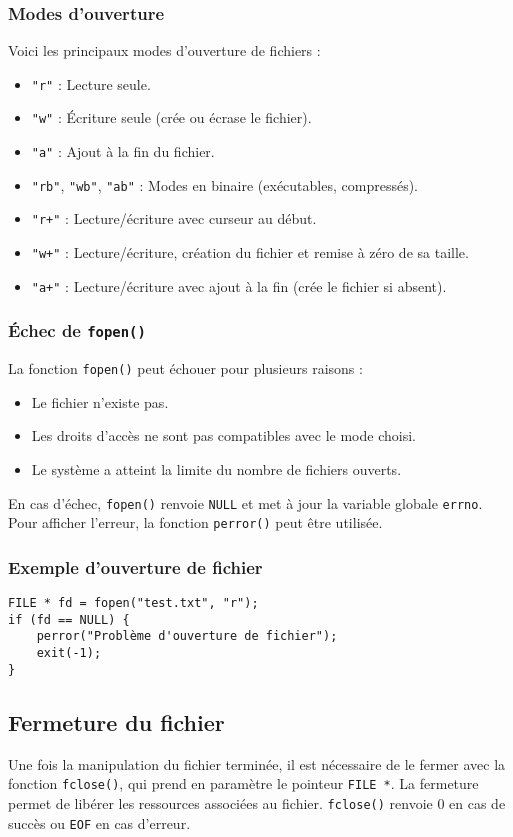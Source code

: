 \documentclass[french,11pt]{article}
\begin{document}
\subsubsection{Modes d’ouverture}
Voici les principaux modes d’ouverture de fichiers :
\begin{itemize}
    \item \texttt{"r"} : Lecture seule.
    \item \texttt{"w"} : Écriture seule (crée ou écrase le fichier).
    \item \texttt{"a"} : Ajout à la fin du fichier.
    \item \texttt{"rb"}, \texttt{"wb"}, \texttt{"ab"} : Modes en binaire (exécutables, compressés).
    \item \texttt{"r+"} : Lecture/écriture avec curseur au début.
    \item \texttt{"w+"} : Lecture/écriture, création du fichier et remise à zéro de sa taille.
    \item \texttt{"a+"} : Lecture/écriture avec ajout à la fin (crée le fichier si absent).
\end{itemize}

\subsubsection{Échec de \texttt{fopen()}}
La fonction \texttt{fopen()} peut échouer pour plusieurs raisons :
\begin{itemize}
    \item Le fichier n’existe pas.
    \item Les droits d’accès ne sont pas compatibles avec le mode choisi.
    \item Le système a atteint la limite du nombre de fichiers ouverts.
\end{itemize}
En cas d’échec, \texttt{fopen()} renvoie \texttt{NULL} et met à jour la variable globale \texttt{errno}. Pour afficher l’erreur, la fonction \texttt{perror()} peut être utilisée.

\subsubsection{Exemple d'ouverture de fichier}
\begin{verbatim}
FILE * fd = fopen("test.txt", "r");
if (fd == NULL) {
    perror("Problème d'ouverture de fichier");
    exit(-1);
}
\end{verbatim}

\subsection{Fermeture du fichier}
Une fois la manipulation du fichier terminée, il est nécessaire de le fermer avec la fonction \texttt{fclose()}, qui prend en paramètre le pointeur \texttt{FILE *}. La fermeture permet de libérer les ressources associées au fichier. \texttt{fclose()} renvoie 0 en cas de succès ou \texttt{EOF} en cas d'erreur.
\end{document}
